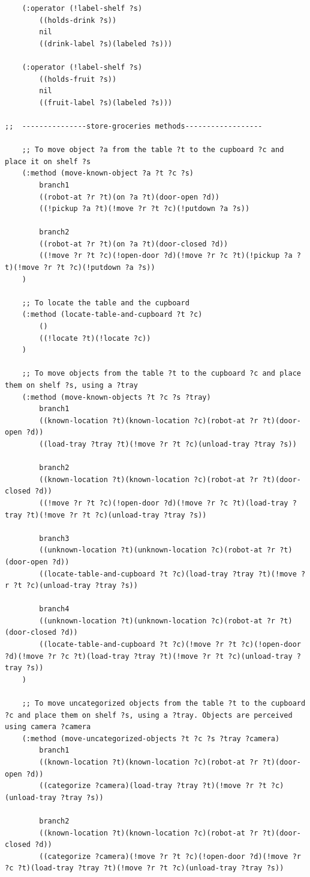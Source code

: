 \documentclass[paper=a4, fontsize=11pt]{scrartcl}
\begin{document}
\begin{lstlisting}
	(:operator (!label-shelf ?s)
		((holds-drink ?s))
		nil
		((drink-label ?s)(labeled ?s)))

	(:operator (!label-shelf ?s)
		((holds-fruit ?s))
		nil
		((fruit-label ?s)(labeled ?s)))

;;  ---------------store-groceries methods------------------

	;; To move object ?a from the table ?t to the cupboard ?c and place it on shelf ?s
	(:method (move-known-object ?a ?t ?c ?s)
		branch1
		((robot-at ?r ?t)(on ?a ?t)(door-open ?d))
		((!pickup ?a ?t)(!move ?r ?t ?c)(!putdown ?a ?s))
		
		branch2
		((robot-at ?r ?t)(on ?a ?t)(door-closed ?d))
		((!move ?r ?t ?c)(!open-door ?d)(!move ?r ?c ?t)(!pickup ?a ?t)(!move ?r ?t ?c)(!putdown ?a ?s))
	)
	
	;; To locate the table and the cupboard
	(:method (locate-table-and-cupboard ?t ?c)
		()
		((!locate ?t)(!locate ?c))
	)
	
	;; To move objects from the table ?t to the cupboard ?c and place them on shelf ?s, using a ?tray
	(:method (move-known-objects ?t ?c ?s ?tray)
		branch1
		((known-location ?t)(known-location ?c)(robot-at ?r ?t)(door-open ?d))
		((load-tray ?tray ?t)(!move ?r ?t ?c)(unload-tray ?tray ?s))
		
		branch2
		((known-location ?t)(known-location ?c)(robot-at ?r ?t)(door-closed ?d))
		((!move ?r ?t ?c)(!open-door ?d)(!move ?r ?c ?t)(load-tray ?tray ?t)(!move ?r ?t ?c)(unload-tray ?tray ?s))
		
		branch3
		((unknown-location ?t)(unknown-location ?c)(robot-at ?r ?t)(door-open ?d))
		((locate-table-and-cupboard ?t ?c)(load-tray ?tray ?t)(!move ?r ?t ?c)(unload-tray ?tray ?s))
		
		branch4
		((unknown-location ?t)(unknown-location ?c)(robot-at ?r ?t)(door-closed ?d))
		((locate-table-and-cupboard ?t ?c)(!move ?r ?t ?c)(!open-door ?d)(!move ?r ?c ?t)(load-tray ?tray ?t)(!move ?r ?t ?c)(unload-tray ?tray ?s))
	)
	
	;; To move uncategorized objects from the table ?t to the cupboard ?c and place them on shelf ?s, using a ?tray. Objects are perceived using camera ?camera
	(:method (move-uncategorized-objects ?t ?c ?s ?tray ?camera)
		branch1
		((known-location ?t)(known-location ?c)(robot-at ?r ?t)(door-open ?d))
		((categorize ?camera)(load-tray ?tray ?t)(!move ?r ?t ?c)(unload-tray ?tray ?s))
		
		branch2
		((known-location ?t)(known-location ?c)(robot-at ?r ?t)(door-closed ?d))
		((categorize ?camera)(!move ?r ?t ?c)(!open-door ?d)(!move ?r ?c ?t)(load-tray ?tray ?t)(!move ?r ?t ?c)(unload-tray ?tray ?s))
		

\end{lstlisting}
\end{document}
